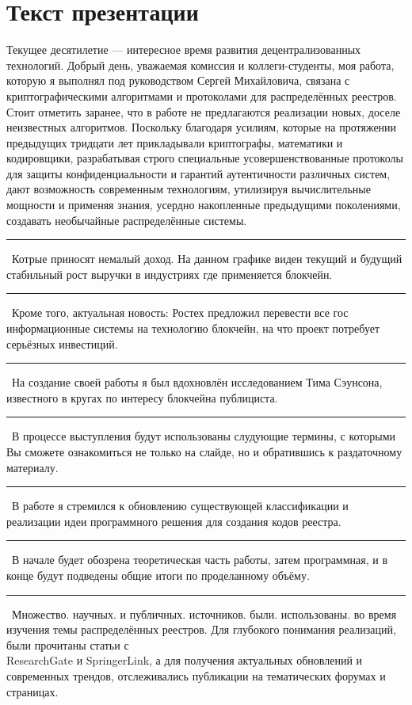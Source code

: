\documentclass[12pt]{article}
\renewcommand{\line}{\noindent\rule{\textwidth}{1pt}}
\begin{document}
\section*{Текст презентации}
Текущее  десятилетие --- интересное время развития децентрализованных
технологий. Добрый день, уважаемая комиссия и коллеги-студенты, моя работа,
которую я выполнял под руководством Сергей Михайловича, связана с
криптографическими алгоритмами и протоколами для распределённых реестров.
Стоит отметить заранее, что в работе не предлагаются реализации новых, доселе
неизвестных алгоритмов. Поскольку благодаря усилиям,  которые  на  протяжении
предыдущих тридцати  лет  прикладывали криптографы,  математики  и кодировщики,
разрабатывая  строго  специальные усовершенствованные  протоколы для  защиты
конфиденциальности  и гарантий аутентичности  различных  систем, дают
возможность современным технологиям, утилизируя вычислительные мощности и
применяя знания, усердно накопленные предыдущими поколениями, создавать
необычайные распределённые системы.\\
\line\
Котрые приносят немалый доход. На данном графике виден текущий и будущий
стабильный рост выручки в индустриях где применяется блокчейн.\\
\line\
Кроме того, актуальная новость: Ростех предложил перевести все гос
информационные системы на технологию блокчейн, на что проект потребует
серьёзных инвестиций.\\
\line\
На создание своей работы я был вдохновлён исследованием Тима Сэунсона,
известного в кругах по интересу блокчейна публициста.\\
\line\
В процессе выступления будут использованы слудующие термины, с которыми Вы
сможете ознакомиться не только на слайде, но и обратившись к раздаточному
материалу.\\
\line\
В работе я стремился к обновлению существующей классификации и реализации идеи
программного решения для создания кодов реестра.\\
\line\
В начале будет обозрена теоретическая часть работы, затем программная, и в
конце будут подведены общие итоги по проделанному объёму.\\
\line\
Множество. научных. и публичных. источников. были. использованы. во время
изучения темы распределённых реестров. Для глубокого понимания реализаций, были
прочитаны статьи с\\ResearchGate и SpringerLink, а для получения актуальных
обновлений и современных трендов, отслеживались публикации на тематических
форумах и страницах.\\
\end{document}
